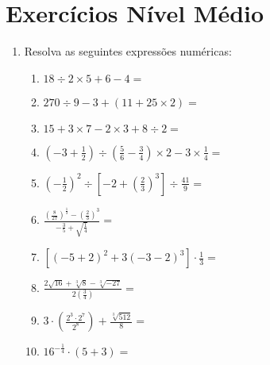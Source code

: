 \newpage
\section{Exercícios Nível Médio}
 \begin{enumerate} 

 \item Resolva as seguintes expressões numéricas:
 \begin{enumerate}
 \item $18 \div 2 \times 5 + 6 - 4=$ 
 \item $270 \div 9 - 3 + (11 + 25 \times 2)=$
 \item $15 + 3 \times 7 - 2 \times 3 + 8 \div 2=$
 \item $\left(-3 + \frac{1}{2} \right) \div \left( \frac{5}{6} - \frac{3}{4} \right) \times 2 - 3 \times \frac{1}{4}=$
 \item $\left(-\frac{1}{2}\right)^2 \div \left[ -2 + \left(\frac{2}{3} \right)^3 \right] \div \frac{41}{9}=$
 \item $\frac{ \left( \frac{8}{27} \right)^{\frac{1}{3}} - \left( \frac{2}{3} \right)^3}{-\frac{3}{5} + \sqrt{\frac{1}{4}}}=$
 \item $[(-5 + 2)^2 + 3(-3-2)^3] \cdot \frac{1}{3}=$
 \item $\frac{2\sqrt{16} + \sqrt[3]{8} - \sqrt[3]{-27}}{2(\frac{3}{4})}=$
 \item $3 \cdot \left(\frac{2^3 \cdot 2^7}{2^8}\right) + \frac{\sqrt[3]{512}}{8}=$
 \item $16^{-\frac{1}{4}} \cdot (5+3)=$
 \end{enumerate}
 

\end{enumerate}
